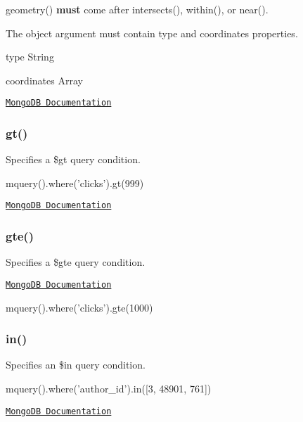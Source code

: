{\ttfamily geometry()} {\bfseries must} come after {\ttfamily intersects()}, {\ttfamily within()}, or {\ttfamily near()}.

The {\ttfamily object} argument must contain {\ttfamily type} and {\ttfamily coordinates} properties.


\begin{DoxyItemize}
\item type {\ttfamily String}
\item coordinates {\ttfamily Array}
\end{DoxyItemize}

\href{http://docs.mongodb.org/manual/reference/operator/geometry/}{\tt Mongo\+DB Documentation}

\subsubsection*{gt()}

Specifies a {\ttfamily \$gt} query condition.


\begin{DoxyCode}
mquery().where('clicks').gt(999)
\end{DoxyCode}


\href{http://docs.mongodb.org/manual/reference/operator/gt/}{\tt Mongo\+DB Documentation}

\subsubsection*{gte()}

Specifies a {\ttfamily \$gte} query condition.

\href{http://docs.mongodb.org/manual/reference/operator/gte/}{\tt Mongo\+DB Documentation}


\begin{DoxyCode}
mquery().where('clicks').gte(1000)
\end{DoxyCode}


\subsubsection*{in()}

Specifies an {\ttfamily \$in} query condition.


\begin{DoxyCode}
mquery().where('author\_id').in([3, 48901, 761])
\end{DoxyCode}


\href{http://docs.mongodb.org/manual/reference/operator/in/}{\tt Mongo\+DB Documentation}

